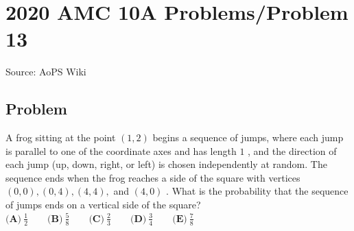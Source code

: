 \documentclass[12pt]{article}
\begin{document}
\section*{{2020 AMC 10A Problems/Problem 13}}
Source: AoPS Wiki

\subsection*{Problem}
A frog sitting at the point $(1, 2)$ begins a sequence of jumps, where each jump is parallel to one of the coordinate axes and has length $1$ , and the direction of each jump (up, down, right, or left) is chosen independently at random. The sequence ends when the frog reaches a side of the square with vertices $(0,0), (0,4), (4,4),$ and $(4,0)$ . What is the probability that the sequence of jumps ends on a vertical side of the square? $\textbf{(A)}\ \frac12\qquad\textbf{(B)}\ \frac 58\qquad\textbf{(C)}\ \frac 23\qquad\textbf{(D)}\ \frac34\qquad\textbf{(E)}\ \frac 78$
\end{document}
